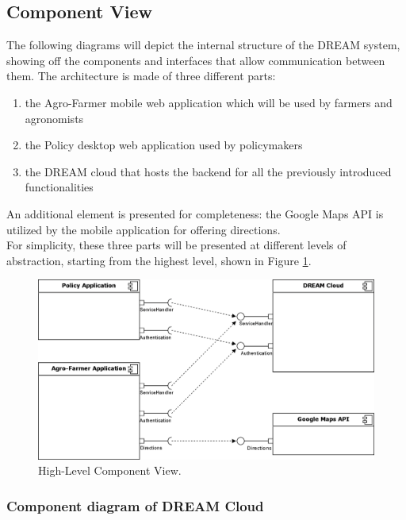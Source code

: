 \subsection{Component View}

The following diagrams will depict the internal structure of the DREAM system, showing off the components and interfaces that allow communication between them. The architecture is made of three different parts:
\begin{enumerate}
	\item the Agro-Farmer mobile web application which will be used by farmers and agronomists
	\item the Policy desktop web application used by policymakers
	\item the DREAM cloud that hosts the backend for all the previously introduced functionalities
\end{enumerate}
An additional element is presented for completeness: the Google Maps API is utilized by the mobile application for offering directions. \\
For simplicity, these three parts will be presented at different levels of abstraction, starting from the highest level, shown in Figure \ref{fig:highLevelComp}.\\

\begin{figure}[hbt!]
\centering
\includegraphics[width=\textwidth]{../images_diagrams/dd/high_level_cloud.png}
\caption{High-Level Component View.}
\label{fig:highLevelComp}
\end{figure}

\subsubsection{Component diagram of DREAM Cloud}

